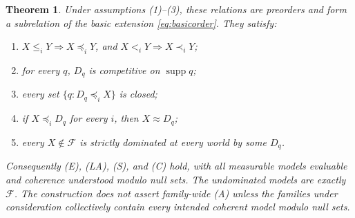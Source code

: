 \documentclass[11pt]{article}
\newtheorem{theorem}{Theorem}
\theoremstyle{remark}
\newcommand{\supp}{\operatorname{supp}}
\newcommand{\F}{\mathcal F}
\begin{document}
\begin{theorem}\label{thm:refinement}
Under assumptions (1)--(3), these relations are preorders and form a
subrelation of the basic extension \eqref{eq:basicorder}. They satisfy:
\begin{enumerate}[label=(\alph*)]
\item $X\le_iY\Rightarrow X\preceq_iY$, and
$X<_iY\Rightarrow X\prec_iY$;
\item for every $q$, $D_q$ is competitive on $\supp q$;
\item every set $\{q:D_q\preceq_iX\}$ is closed;
\item if $X\preceq_iD_q$ for every $i$, then $X\approx D_q$;
\item every $X\notin\F$ is strictly dominated at every world by some $D_q$.
\end{enumerate}
Consequently (E), (LA), (S), and (C) hold, with all measurable models
evaluable and coherence understood modulo null sets. The undominated models
are exactly $\F$. The construction does not assert family-wide (A) unless
the families under consideration collectively contain every intended coherent
model modulo null sets.
\end{theorem}
\end{document}
